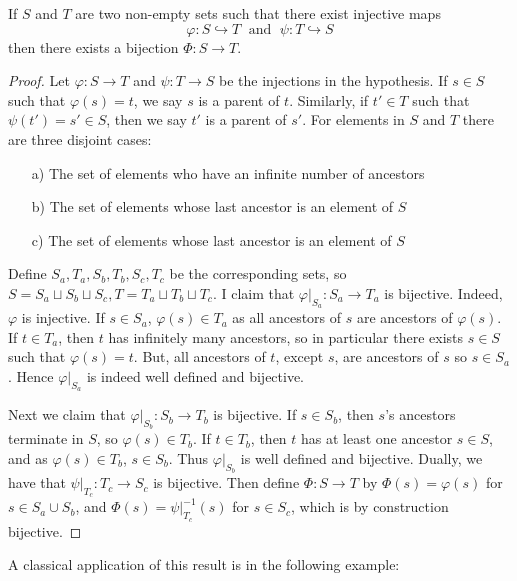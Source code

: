 \begin{theorem}
    If $S$ and $T$ are two non-empty sets such that there exist injective maps $$\varphi:S\hookrightarrow T\;\text{ and }\;\psi:T\hookrightarrow S$$ then there exists a bijection $\Phi:S\rightarrow T$.
\end{theorem}
\begin{proof}
    Let $\varphi:S\rightarrow T$ and $\psi:T\rightarrow S$ be the injections in the hypothesis. If $s \in S$ such that $\varphi(s) = t$, we say $s$ is a parent of $t$. Similarly, if $t' \in T$ such that $\psi(t') = s' \in S$, then we say $t'$ is a parent of $s'$. For elements in $S$ and $T$ there are three disjoint cases: \begin{itemize}
        \item[a)] The set of elements who have an infinite number of ancestors
        \item[b)] The set of elements whose last ancestor is an element of $S$
        \item[c)] The set of elements whose last ancestor is an element of $S$
    \end{itemize}
    Define $S_a,T_a,S_b,T_b,S_c,T_c$ be the corresponding sets, so $S = S_a\sqcup S_b\sqcup S_c, T = T_a\sqcup T_b\sqcup T_c$. I claim that $\varphi\vert_{S_a}:S_a\rightarrow T_a$ is bijective. Indeed, $\varphi$ is injective. If $s \in S_a$, $\varphi(s) \in T_a$ as all ancestors of $s$ are ancestors of $\varphi(s)$. If $t \in T_a$, then $t$ has infinitely many ancestors, so in particular there exists $s \in S$ such that $\varphi(s) = t$. But, all ancestors of $t$, except $s$, are ancestors of $s$ so $s \in S_a$. Hence $\varphi\vert_{S_a}$ is indeed well defined and bijective. 

    Next we claim that $\varphi\vert_{S_b}:S_b\rightarrow T_b$ is bijective. If $s \in S_b$, then $s$'s ancestors terminate in $S$, so $\varphi(s) \in T_b$. If $t \in T_b$, then $t$ has at least one ancestor $s \in S$, and as $\varphi(s) \in T_b$, $s \in S_b$. Thus $\varphi\vert_{S_b}$ is well defined and bijective. Dually, we have that $\psi\vert_{T_c}:T_c\rightarrow S_c$ is bijective. Then define $\Phi:S\rightarrow T$ by $\Phi(s) = \varphi(s)$ for $s \in S_a\cup S_b$, and $\Phi(s) = \psi\vert_{T_c}^{-1}(s)$ for $s \in S_c$, which is by construction bijective.
\end{proof}

A classical application of this result is in the following example:

